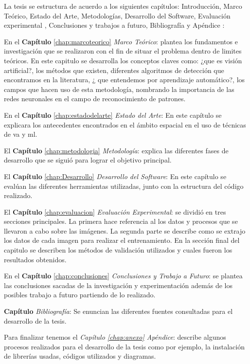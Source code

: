 La tesis se estructura de acuerdo a los siguientes capítulos: Introducción, Marco Teórico, Estado del Arte, Metodologías, Desarrollo del Software, Evaluación experimental , Conclusiones y trabajos a futuro, Bibliografía y Apéndice :

En el \textbf{Capítulo} \ref{chap:marcoteorico} \textit{Marco Teórico}: plantea los fundamentos e investigación que se realizaron con el fin de situar el problema dentro de limites teóricos. En este capitulo se desarrolla los conceptos claves como: ¿que es visión artificial?, los métodos que existen, diferentes algoritmos de detección que encontramos en la literatura, ¿ que entendemos por aprendizaje automático?, los campos que hacen uso de esta metodología, nombrando la importancia de las redes neuronales en el campo de reconocimiento de patrones.

En el \textbf{Capítulo} \ref{chap:estadodelarte} \textit{Estado del Arte}: En este capítulo se explicara los antecedentes encontrados en el ámbito espacial en el uso de técnicas de \ac{va} y \ac{ml}.

El \textbf{Capítulo} \ref{chap:metodologia} \textit{Metodología}: explica las diferentes fases de desarrollo que se siguió para lograr el objetivo principal.

El \textbf{Capítulo} \ref{chap:Desarrollo} \textit{Desarrollo del Software}: En este capítulo se evalúan las diferentes herramientas utilizadas, junto con la estructura del código realizado.

El \textbf{Capítulo} \ref{chap:evaluacion} \textit{Evaluación Experimental}:  se  dividió en tres secciones principales. La primera hace referencia al los datos y procesos que se llevaron a cabo sobre las imágenes. La segunda parte se describe como se extrajo los datos de cada imagen para realizar el entrenamiento. En la sección final del capitulo se describen los métodos de validación utilizados y cuales fueron los resultados obtenidos.

En el \textbf{Capítulo} \ref{chap:conclusiones} \textit{Conclusiones y Trabajo a Futuro}: se plantea las conclusiones sacadas de la investigación y experimentación además de los posibles trabajo a futuro partiendo de lo realizado.

\textbf{Capítulo} \textit{Bibliografía}: Se enuncian las diferentes fuentes consultadas para el desarrollo de la tesis.

Para finalizar tenemos el \textit{Capítulo \ref{chap:anexo} Apéndice}: describe algunos procesos realizados para el desarrollo de la tesis como por ejemplo, la instalación de librerías usadas, códigos utilizados y diagramas.
